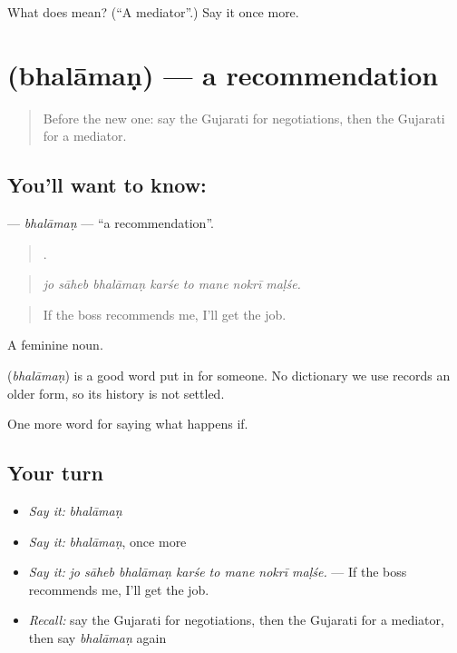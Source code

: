 \begin{tcolorbox}[breakable,colback=teal!4,colframe=teal!35!black,title={Before you move on}]
What does  mean? (\textquotedblleft{}A mediator\textquotedblright{}.) Say it once more.
\end{tcolorbox}
\section[\texorpdfstring{\gu{ભલામણ} (bhalāmaṇ)}{ભલામણ (bhalāmaṇ)}]{ (bhalāmaṇ) — a recommendation}

\label{lesson:GU-C542-bhalaman}



\begin{quote}
Before the new one: say the Gujarati for negotiations, then the Gujarati for a mediator.
\end{quote}

\subsection*{You'll want to know: }
\textbf{} — \emph{bhalāmaṇ} — \textquotedblleft{}a recommendation\textquotedblright{}.

\begin{quote}
       .
\end{quote}

\begin{quote}
\emph{jo sāheb bhalāmaṇ karśe to mane nokrī maḷśe.}
\end{quote}

\begin{quote}
If the boss recommends me, I'll get the job.
\end{quote}

A feminine noun.

\begin{cousinweb}
\textbf{} (\emph{bhalāmaṇ}) is a good word put in for someone. No dictionary we use records an older form, so its history is not settled.
\end{cousinweb}

\begin{grammarlens}[title={What you've built}]
One more word for saying what happens if.
\end{grammarlens}

\subsection*{Your turn}
\begin{itemize}
\raggedright
  \item \emph{Say it:} \emph{bhalāmaṇ}
  \item \emph{Say it:} \emph{bhalāmaṇ}, once more
  \item \emph{Say it:} \emph{jo sāheb bhalāmaṇ karśe to mane nokrī maḷśe.} — If the boss recommends me, I'll get the job.
  \item \emph{Recall:} say the Gujarati for negotiations, then the Gujarati for a mediator, then say \emph{bhalāmaṇ} again
\end{itemize}

